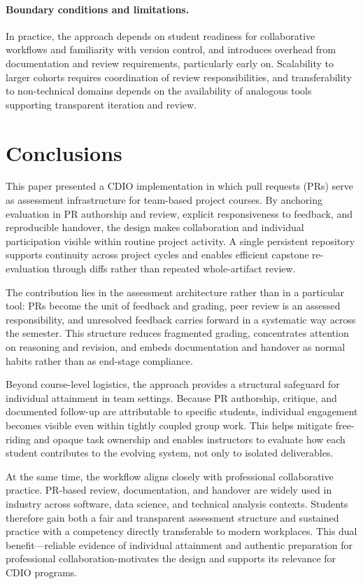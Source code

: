 \paragraph{Boundary conditions and limitations.}
In practice, the approach depends on student readiness for collaborative workflows and familiarity with version control, and introduces overhead from documentation and review requirements, particularly early on. Scalability to larger cohorts requires coordination of review responsibilities, and transferability to non-technical domains depends on the availability of analogous tools supporting transparent iteration and review.

\section{Conclusions}
This paper presented a CDIO implementation in which pull requests (PRs) serve as assessment infrastructure for team-based project courses. By anchoring evaluation in PR authorship and review, explicit responsiveness to feedback, and reproducible handover, the design makes collaboration and individual participation visible within routine project activity. A single persistent repository supports continuity across project cycles and enables efficient capstone re-evaluation through diffs rather than repeated whole-artifact review.

The contribution lies in the assessment architecture rather than in a particular tool: PRs become the unit of feedback and grading, peer review is an assessed responsibility, and unresolved feedback carries forward in a systematic way across the semester. This structure reduces fragmented grading, concentrates attention on reasoning and revision, and embeds documentation and handover as normal habits rather than as end-stage compliance.

Beyond course-level logistics, the approach provides a structural safeguard for individual attainment in team settings. Because PR authorship, critique, and documented follow-up are attributable to specific students, individual engagement becomes visible even within tightly coupled group work. This helps mitigate free-riding and opaque task ownership and enables instructors to evaluate how each student contributes to the evolving system, not only to isolated deliverables.

At the same time, the workflow aligns closely with professional collaborative practice. PR-based review, documentation, and handover are widely used in industry across software, data science, and technical analysis contexts. Students therefore gain both a fair and transparent assessment structure and sustained practice with a competency directly transferable to modern workplaces. This dual benefit—reliable evidence of individual attainment and authentic preparation for professional collaboration-motivates the design and supports its relevance for CDIO programs.

